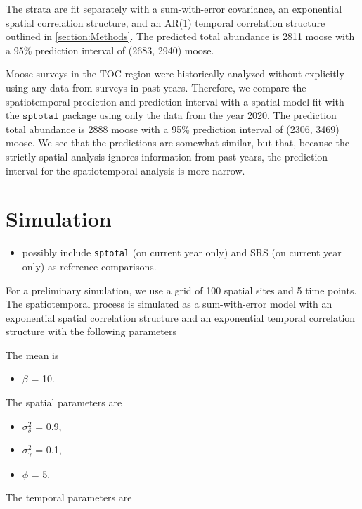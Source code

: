 \documentclass[]{interact}
\theoremstyle{plain}%
\theoremstyle{definition}
\theoremstyle{remark}
\def\tightlist{}
\begin{document}
The strata are fit separately with a sum-with-error covariance, an
exponential spatial correlation structure, and an AR(1) temporal
correlation structure outlined in \ref{section:Methods}. The predicted
total abundance is 2811 moose with a 95\% prediction interval of (2683,
2940) moose.

Moose surveys in the TOC region were historically analyzed without
explicitly using any data from surveys in past years. Therefore, we
compare the spatiotemporal prediction and prediction interval with a
spatial model fit with the \(\texttt{sptotal}\) package using only the
data from the year 2020. The prediction total abundance is 2888 moose
with a 95\% prediction interval of (2306, 3469) moose. We see that the
predictions are somewhat similar, but that, because the strictly spatial
analysis ignores information from past years, the prediction interval
for the spatiotemporal analysis is more narrow.

\section{Simulation} \label{section:Simulation}

\begin{itemize}
\tightlist
\item
  possibly include \texttt{sptotal} (on current year only) and SRS (on
  current year only) as reference comparisons.
\end{itemize}

For a preliminary simulation, we use a grid of 100 spatial sites and 5
time points. The spatiotemporal process is simulated as a sum-with-error
model with an exponential spatial correlation structure and an
exponential temporal correlation structure with the following parameters

The mean is

\begin{itemize}
\tightlist
\item
  \(\beta\) = 10.
\end{itemize}

The spatial parameters are

\begin{itemize}
\tightlist
\item
  \(\sigma^2_{\delta}\) = 0.9,
\item
  \(\sigma^2_{\gamma}\) = 0.1,
\item
  \(\phi\) = 5.
\end{itemize}

The temporal parameters are
\end{document}
